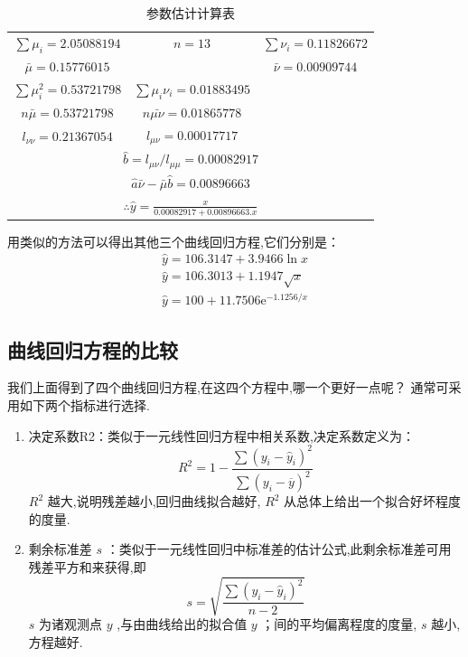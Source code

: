 \begin{table}[htb]
	\centering
	\caption{参数估计计算表}
	\begin{tabular}{ccc}
		$ \sum \mu_i=2.050 88194 $ 	&    $ n=13 $     &  $ \sum \nu_i=0.11826672 $  \\
		$ \bar{\mu}=0.157 76015 $ 	&       &  $ \bar{\nu} =0.009 097 44$  \\
		$ \sum\mu_{i}^{2}=0.537 217 98 $ 	&    $ \sum\mu_i\nu_i=0.01883495 $     &  \\
		$ n\bar{\mu}=0.537 21798 $ 	&   $ n\bar{\mu\nu}=0.01865778 $      &  \\
		$ l_{\nu\nu}=0.21367054 $ 	&   $ l_{\mu\nu}=0.000 17717 $      &  \\
		\multicolumn{3}{c}{ $ \hat{b}=l_{\mu\nu }/l_{\mu\mu}=0.00082917 $ } \\
		\multicolumn{3}{c}{ $ \hat{a}\bar{\nu}-\bar{\mu}\hat{b}=0.00896663 $ } \\
		\multicolumn{3}{c}{ $ \therefore \widehat{y}=\frac{x}{0.00082917+0.00896663.x} $ } \\
	\end{tabular}%
	\label{tab:addlabel}%
\end{table}%
用类似的方法可以得出其他三个曲线回归方程,它们分别是：
\[
\begin{array}{l}
{\hat{y}=106.3147+3.9466 \ln x} \\ 
{\hat{y}=106.3013+1.1947 \sqrt{x}} \\ 
{\hat{y}=100+11.7506 \mathrm{e}^{-1.1256 / x}}
\end{array}
\]

\subsection{曲线回归方程的比较}\label{sec:8.5.3}

我们上面得到了四个曲线回归方程,在这四个方程中,哪一个更好一点呢？
通常可采用如下两个指标进行选择.
\begin{enumerate}
	\item 决定系数R2：类似于一元线性回归方程中相关系数,决定系数定义为：
	\begin{equation}
	R^{2}=1-\frac{\sum\left(y_{i}-\hat{y}_{i}\right)^{2}}{\sum\left(y_{i}-\overline{y}\right)^{2}}\label{eq:8.5.5}
	\end{equation} $ R^2 $ 越大,说明残差越小,回归曲线拟合越好, $ R^2 $ 从总体上给出一个拟合好坏程度的度量.
	\item 剩余标准差 $ s $ ：类似于一元线性回归中标准差的估计公式,此剩余标准差可用残差平方和来获得,即
	\begin{equation}
	s=\sqrt{\frac{\sum (y_i-\hat{y}_i)^2}{n-2}}\label{eq:8.5.6}
	\end{equation}
	$ s $ 为诸观测点 $ y $ ,与由曲线给出的拟合值 $ y $ ；间的平均偏离程度的度量, $ s $ 越小,方程越好.
\end{enumerate}

